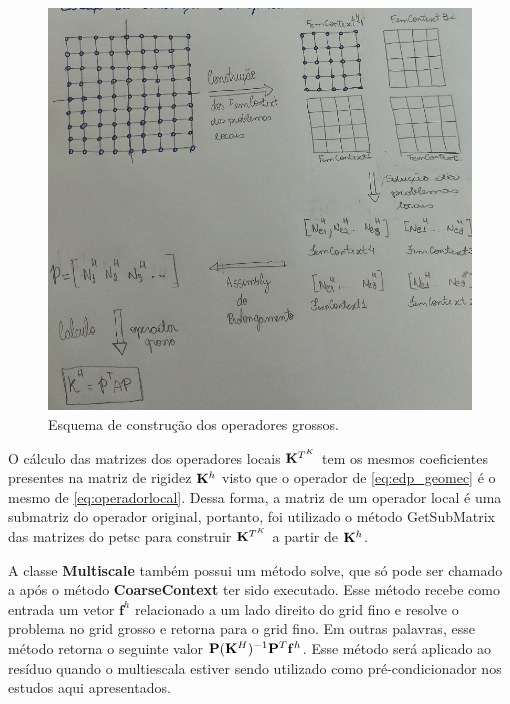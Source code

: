 \begin{figure}[!htbp]
\centering
\includegraphics[width=\textwidth]{chap07/figs/esquemaprolongamento.png}
\caption{Esquema de construção dos operadores grossos.}
\label{fig:esquemaconstrucao}
\end{figure}

O cálculo das matrizes dos operadores locais  $\mathbf{K}^{T^K}$ tem os mesmos coeficientes presentes na matriz de rigidez $\mathbf{K}^h$ visto que o operador de \eqref{eq:edp_geomec} é o mesmo de \eqref{eq:operadorlocal}. Dessa forma, a matriz de um operador local é uma submatriz do operador original, portanto, foi utilizado o método GetSubMatrix das matrizes do petsc para construir $\mathbf{K}^{T^K}$ a partir de $\mathbf{K}^h$.


A classe \textbf{Multiscale} também possui um método solve, que só pode ser chamado a após o método \textbf{CoarseContext} ter sido executado. Esse método recebe como entrada um vetor $\mathbf{f}^h$ relacionado a um lado direito do grid fino e resolve o problema no grid grosso e retorna para o grid fino. Em outras palavras, esse método retorna o seguinte valor $\mathbf{P}(\mathbf{K}^H)^{-1}\mathbf{P}^T \mathbf{f}^h$. Esse método será aplicado ao resíduo quando o multiescala estiver sendo utilizado como pré-condicionador nos estudos aqui apresentados. 
                                                                                       